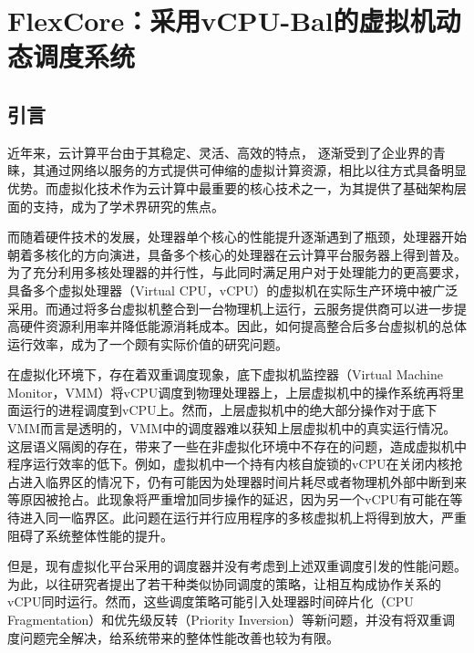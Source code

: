 
\chapter{FlexCore：采用vCPU-Bal的虚拟机动态调度系统}
\label{chap:flexcore}



\section{引言}

近年来，云计算平台由于其稳定、灵活、高效的特点， 逐渐受到了企业界的青睐，其通过网络以服务的方式提供可伸缩的虚拟计算资源，相比以往方式具备明显优势。而虚拟化技术作为云计算中最重要的核心技术之一，为其提供了基础架构层面的支持，成为了学术界研究的焦点\cite{barham2003xen}\cite{kivity2007kvm}。

而随着硬件技术的发展，处理器单个核心的性能提升逐渐遇到了瓶颈，处理器开始朝着多核化的方向演进，具备多个核心的处理器在云计算平台服务器上得到普及。为了充分利用多核处理器的并行性，与此同时满足用户对于处理能力的更高要求，具备多个虚拟处理器（Virtual CPU，vCPU）的虚拟机在实际生产环境中被广泛采用\cite{xu2009performance}。而通过将多台虚拟机整合到一台物理机上运行，云服务提供商可以进一步提高硬件资源利用率并降低能源消耗成本\cite{lv2012virtualization}。因此，如何提高整合后多台虚拟机的总体运行效率，成为了一个颇有实际价值的研究问题。

在虚拟化环境下，存在着双重调度现象\cite{song2013schedule}，底下虚拟机监控器（Virtual Machine Monitor，VMM）将vCPU调度到物理处理器上，上层虚拟机中的操作系统再将里面运行的进程调度到vCPU上。然而，上层虚拟机中的绝大部分操作对于底下VMM而言是透明的，VMM中的调度器难以获知上层虚拟机中的真实运行情况。这层语义隔阂\cite{chen2001virtual}的存在，带来了一些在非虚拟化环境中不存在的问题，造成虚拟机中程序运行效率的低下。例如，虚拟机中一个持有内核自旋锁的vCPU在关闭内核抢占进入临界区的情况下，仍有可能因为处理器时间片耗尽或者物理机外部中断到来等原因被抢占。此现象将严重增加同步操作的延迟，因为另一个vCPU有可能在等待进入同一临界区。此问题在运行并行应用程序的多核虚拟机上将得到放大，严重阻碍了系统整体性能的提升。

但是，现有虚拟化平台采用的调度器并没有考虑到上述双重调度引发的性能问题。为此，以往研究者提出了若干种类似协同调度的策略\cite{weng2009hybrid}\cite{sukwong2011co}\cite{bai2010task}，让相互构成协作关系的vCPU同时运行。然而，这些调度策略可能引入处理器时间碎片化（CPU Fragmentation）和优先级反转（Priority Inversion）等新问题，并没有将双重调度问题完全解决，给系统带来的整体性能改善也较为有限。

